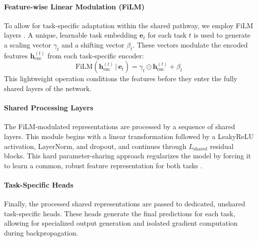 \paragraph*{Feature-wise Linear Modulation (FiLM)}
To allow for task-specific adaptation within the shared pathway, we employ FiLM layers \cite{perez2018film}. A unique, learnable task embedding $\mathbf{e}_{t}$ for each task $t$ is used to generate a scaling vector $\gamma_{t}$ and a shifting vector $\beta_{t}$. These vectors modulate the encoded features $\mathbf{h}_{\mathrm{enc}}^{(t)}$ from each task-specific encoder:
$$
\mathrm{FiLM}(\mathbf{h}_{\mathrm{enc}}^{(t)} \,|\, \mathbf{e}_{t}) = \gamma_{t} \odot \mathbf{h}_{\mathrm{enc}}^{(t)} + \beta_{t}
$$
This lightweight operation conditions the features before they enter the fully shared layers of the network.

\paragraph*{Shared Processing Layers}
The FiLM-modulated representations are processed by a sequence of shared layers. This module begins with a linear transformation followed by a LeakyReLU activation, LayerNorm, and dropout, and continues through $L_{\mathrm{shared}}$ residual blocks. This hard parameter-sharing approach regularizes the model by forcing it to learn a common, robust feature representation for both tasks \cite{baxter2000model}.

\paragraph*{Task-Specific Heads}
Finally, the processed shared representations are passed to dedicated, unshared task-specific heads. These heads generate the final predictions for each task, allowing for specialized output generation and isolated gradient computation during backpropagation.

